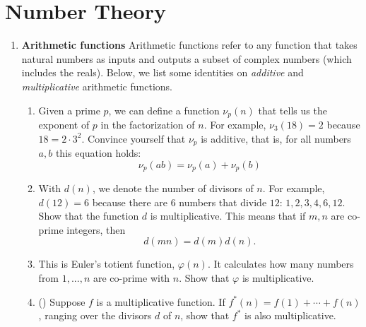 \documentclass[11pt]{scrartcl}
\begin{document}
\newpage
\section{Number Theory}
\begin{enumerate}[label=\textbf{N\arabic*}.]
    \item \textbf{Arithmetic functions} \newline
    Arithmetic functions refer to any function that takes natural numbers as inputs and outputs a subset of complex numbers (which includes the reals). Below, we list some identities on \emph{additive} and \emph{multiplicative} arithmetic functions.
    \begin{enumerate}
        \item Given a prime $p$, we can define a function $\nu_p(n)$ that tells us the exponent of $p$ in the factorization of $n$. For example, $\nu_3(18) = 2$ because $18 = 2\cdot 3^2$. \newline
        Convince yourself that $\nu_p$ is additive, that is, for all numbers $a,b$ this equation holds:
        \[ \nu_p(ab) = \nu_p(a)+\nu_p(b) \]
        
        \item With $d(n)$, we denote the number of divisors of $n$. For example, $d(12) = 6$ because there are $6$ numbers that divide $12$: $1,2,3,4,6,12$. \newline
        Show that the function $d$ is multiplicative. This means that if $m, n$ are co-prime integers, then
        \[ d(mn) = d(m)d(n). \]
        
        \item This is Euler's totient function, $\varphi(n)$. It calculates how many numbers from $1, ..., n$ are co-prime with $n$. Show that $\varphi$ is multiplicative.
        
        \item (\fullchili) Suppose $f$ is a multiplicative function. If $f^*(n) = f(1) + \cdots + f(n)$, ranging over the divisors $d$ of $n$, show that $f^*$ is also multiplicative.
    \end{enumerate}
\end{enumerate}
\end{document}
